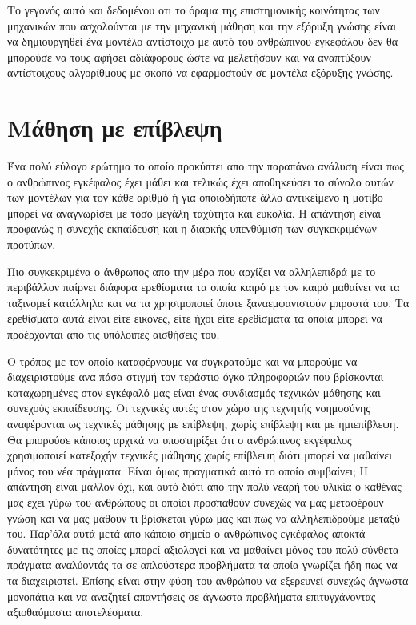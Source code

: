\par Το γεγονός αυτό και δεδομένου οτι το όραμα της επιστημονικής κοινότητας των μηχανικών που ασχολούνται με την μηχανική μάθηση και την εξόρυξη γνώσης είναι να δημιουργηθεί ένα μοντέλο αντίστοιχο με αυτό του ανθρώπινου εγκεφάλου δεν θα μπορούσε να τους αφήσει αδιάφορους ώστε να μελετήσουν και να αναπτύξουν αντίστοιχους αλγορίθμους με σκοπό να εφαρμοστούν σε μοντέλα εξόρυξης γνώσης.


\section{Μάθηση με επίβλεψη}
\par
Ένα πολύ εύλογο ερώτημα το οποίο προκύπτει απο την παραπάνω ανάλυση είναι πως ο ανθρώπινος εγκέφαλος έχει μάθει και τελικώς έχει αποθηκεύσει το σύνολο αυτών των μοντέλων για τον κάθε αριθμό ή για οποιοδήποτε άλλο αντικείμενο ή μοτίβο μπορεί να αναγνωρίσει με τόσο μεγάλη ταχύτητα και ευκολία. Η απάντηση είναι προφανώς η συνεχής εκπαίδευση και η διαρκής υπενθύμιση των συγκεκριμένων προτύπων.
\par
Πιο συγκεκριμένα ο άνθρωπος απο την μέρα που αρχίζει να αλληλεπιδρά με το περιβάλλον παίρνει διάφορα ερεθίσματα τα οποία καιρό με τον καιρό μαθαίνει να τα ταξινομεί κατάλληλα και να τα χρησιμοποιεί όποτε ξαναεμφανιστούν μπροστά του. Τα ερεθίσματα αυτά είναι είτε εικόνες, είτε ήχοι είτε ερεθίσματα τα οποία μπορεί να προέρχονται απο τις υπόλοιπες αισθήσεις του.
\par
Ο τρόπος με τον οποίο καταφέρνουμε να συγκρατούμε και να μπορούμε να διαχειριστούμε ανα πάσα στιγμή τον τεράστιο όγκο πληροφοριών που βρίσκονται καταχωρημένες στον εγκέφαλό μας είναι ένας συνδιασμός τεχνικών μάθησης και συνεχούς εκπαίδευσης. Οι τεχνικές αυτές στον χώρο της τεχνητής νοημοσύνης αναφέρονται ως τεχνικές μάθησης με επίβλεψη, χωρίς επίβλεψη και με ημιεπίβλεψη. Θα μπορούσε κάποιος αρχικά να υποστηρίξει ότι ο ανθρώπινος εκγέφαλος χρησιμοποιεί κατεξοχήν τεχνικές μάθησης χωρίς επίβλεψη διότι μπορεί να μαθαίνει μόνος του νέα πράγματα. Είναι όμως πραγματικά αυτό το οποίο συμβαίνει; Η απάντηση είναι μάλλον όχι, και αυτό διότι απο την πολύ νεαρή του υλικία ο καθένας μας έχει γύρω του ανθρώπους οι οποίοι προσπαθούν συνεχώς να μας μεταφέρουν γνώση και να μας μάθουν τι βρίσκεται γύρω μας και πως να αλληλεπιδρούμε μεταξύ του. Παρ'όλα αυτά μετά απο κάποιο σημείο ο ανθρώπινος εγκέφαλος αποκτά δυνατότητες με τις οποίες μπορεί αξιολογεί και να μαθαίνει μόνος του πολύ σύνθετα πράγματα αναλύοντάς τα σε απλούστερα προβλήματα τα οποία γνωρίζει ήδη πως να τα διαχειριστεί. Επίσης είναι στην φύση του ανθρώπου να εξερευνεί συνεχώς άγνωστα μονοπάτια και να αναζητεί απαντήσεις σε άγνωστα προβλήματα επιτυγχάνοντας αξιοθαύμαστα αποτελέσματα.
